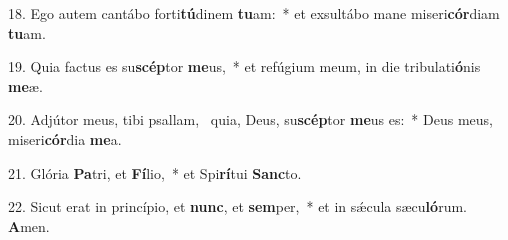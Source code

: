 18. Ego autem cantábo forti\textbf{tú}dinem \textbf{tu}am:~*  et exsultábo mane miseri\textbf{cór}diam \textbf{tu}am.\

19. Quia factus es su\textbf{scép}tor \textbf{me}us,~*  et refúgium meum, in die tribulati\textbf{ó}nis \textbf{me}æ.\

20. Adjútor meus, tibi psallam, \dag\  quia, Deus, su\textbf{scép}tor \textbf{me}us es:~*  Deus meus, miseri\textbf{cór}dia \textbf{me}a.\

21. Glória \textbf{Pa}tri, et \textbf{Fí}lio,~*  et Spi\textbf{rí}tui \textbf{Sanc}to.\

22. Sicut erat in princípio, et \textbf{nunc}, et \textbf{sem}per,~*  et in sǽcula sæcu\textbf{ló}rum. \textbf{A}men.\

